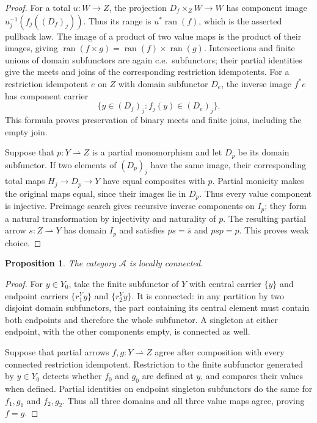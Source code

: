 \documentclass[11pt]{article}
\newtheorem{proposition}[theorem]{Proposition}
\newcommand{\ran}{\operatorname{ran}}
\begin{document}
\begin{proof}
For a total $u:W\to Z$, the projection
$D_f\times_Z W\to W$ has component image
$u_j^{-1}(f_j((D_f)_j))$. Thus its range is $u^*\ran(f)$,
which is the asserted pullback law. The image of a product
of two value maps is the product of their images, giving
$\ran(f\times g)=\ran(f)\times\ran(g)$.
Intersections and finite unions of domain subfunctors are again
c.e.\ subfunctors; their partial identities give the meets and joins
of the corresponding restriction idempotents. For a restriction idempotent
$e$ on $Z$ with domain subfunctor $D_e$, the inverse image $f^*e$
has component carrier
\[
 \{y\in(D_f)_j:f_j(y)\in(D_e)_j\}.
\]
This formula proves preservation of binary meets and finite joins,
including the empty join.

Suppose that $p:Y\rightharpoonup Z$ is a partial monomorphism
and let $D_p$ be its domain subfunctor. If two elements of $(D_p)_j$
have the same image, their corresponding total maps
$H_j\to D_p\to Y$ have equal composites with $p$.
Partial monicity makes the original maps equal, since their
images lie in $D_p$. Thus every value component is injective.
Preimage search gives recursive inverse components on $I_p$;
they form a natural transformation by injectivity and naturality of $p$.
The resulting partial arrow $s:Z\rightharpoonup Y$ has domain
$I_p$ and satisfies $ps=\bar s$ and $psp=p$.
This proves weak choice.
\end{proof}

\begin{proposition}\label{prop:fork-local}
The category $\mathcal A$ is locally connected.
\end{proposition}
\begin{proof}
For $y\in Y_0$, take the finite subfunctor of $Y$ with central
carrier $\{y\}$ and endpoint carriers
$\{r_1^Yy\}$ and $\{r_2^Yy\}$. It is connected: in any partition
by two disjoint domain subfunctors, the part containing its central
element must contain both endpoints and therefore the whole
subfunctor. A singleton at either endpoint, with the other
components empty, is connected as well.

Suppose that partial arrows $f,g:Y\rightharpoonup Z$ agree
after composition with every connected restriction idempotent.
Restriction to the
finite subfunctor generated by $y\in Y_0$ detects whether
$f_0$ and $g_0$ are defined at $y$, and compares their values
when defined. Partial identities on endpoint singleton subfunctors do
the same for $f_1,g_1$ and $f_2,g_2$. Thus all three domains and all three
value maps agree, proving $f=g$.
\end{proof}
\end{document}
